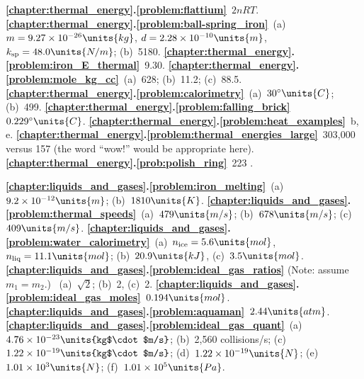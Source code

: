 
\noindent 
{\bf \ref{chapter:thermal_energy}.\ref{problem:flattium}}~$2nRT$.
{\bf \ref{chapter:thermal_energy}.\ref{problem:ball-spring_iron}}~(a)~$m=9.27
\times 10^{-26}\units{kg}$, $d=2.28\times 10^{-10}\units{m}$, 
$k_\text{sp}=48.0\units{N/m}$; (b)~5180.
{\bf \ref{chapter:thermal_energy}.\ref{problem:iron_E_thermal}}~9.30.
{\bf \ref{chapter:thermal_energy}.\ref{problem:mole_kg_cc}}~(a)~628; 
(b)~11.2; (c)~88.5.
{\bf \ref{chapter:thermal_energy}.\ref{problem:calorimetry}}~(a)~$30^\circ\units{C}$; (b)~499.
{\bf \ref{chapter:thermal_energy}.\ref{problem:falling_brick}}~$0.229^\circ\units{C}$.
{\bf \ref{chapter:thermal_energy}.\ref{problem:heat_examples}}~b, e.
{\bf \ref{chapter:thermal_energy}.\ref{problem:thermal_energies_large}}~303,000  versus 157  (the word ``wow!'' would be appropriate here).
{\bf \ref{chapter:thermal_energy}.\ref{prob:polish_ring}}~223 .
\medskip



\noindent
{\bf \ref{chapter:liquids_and_gases}.\ref{problem:iron_melting}}~(a)~$9.2\times 10^{-12}\units{m}$; (b)~$1810
\units{K}$.
{\bf \ref{chapter:liquids_and_gases}.\ref{problem:thermal_speeds}}~(a)~$479
\units{m/s}$; (b)~$678\units{m/s}$; (c)~$409\units{m/s}$.
{\bf \ref{chapter:liquids_and_gases}.\ref{problem:water_calorimetry}}~(a)~$n_\text{ice}=5.6\units{mol}$, $n_\text{liq}=11.1\units{mol}$; 
(b)~$20.9\units{kJ}$, (c)~$3.5\units{mol}$.
{\bf \ref{chapter:liquids_and_gases}.\ref{problem:ideal_gas_ratios}} 
(Note:  assume $m_1 = m_2$.) ~(a)~$\sqrt{2}$; (b)~2, (c)~2.
{\bf \ref{chapter:liquids_and_gases}.\ref{problem:ideal_gas_moles}}~$0.194\units{mol}$.
{\bf \ref{chapter:liquids_and_gases}.\ref{problem:aquaman}}~$2.44\units{atm}$.
{\bf \ref{chapter:liquids_and_gases}.\ref{problem:ideal_gas_quant}}~(a)~$4.76
\times 10^{-23}\units{kg$\cdot$m/s}$; (b)~2,560 collisions/s; (c)~$1.22\times
10^{-19}\units{kg$\cdot$m/s}$; (d)~$1.22\times 10^{-19}\units{N}$;
(e)~$1.01\times 10^3\units{N}$; (f)~$1.01\times 10^5\units{Pa}$.
\medskip

